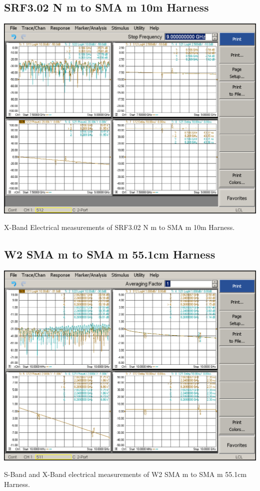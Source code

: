 \subsection{SRF3.02 N m to SMA m 10m Harness}

\begin{table}[H]
	\centering
	\includegraphics[width=0.8\linewidth]{figuras/measures/SRF3.02-XB.png}
	\caption{X-Band Electrical measurements of SRF3.02 N m to SMA m 10m Harness.}
	\label{fig:SRF3.02X}
\end{table}



\subsection{W2 SMA m to SMA m 55.1cm Harness}

\begin{table}[H]
	\centering
	\includegraphics[width=0.8\linewidth]{figuras/measures/W2_10M_10G}
	\caption{S-Band and X-Band electrical measurements of W2 SMA m to SMA m 55.1cm Harness.}
	\label{fig:W2}
\end{table}

